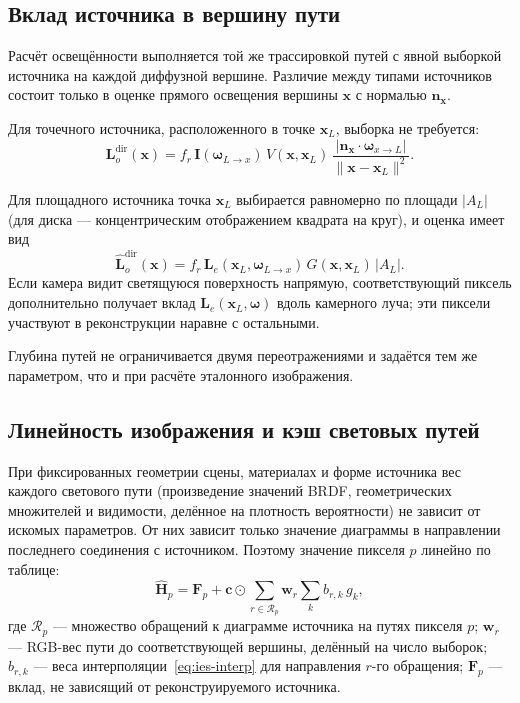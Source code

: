 \subsection{Вклад источника в вершину пути}

Расчёт освещённости выполняется той же трассировкой путей с явной выборкой источника на каждой диффузной вершине. Различие между типами источников состоит только в оценке прямого освещения вершины $\mathbf{x}$ с нормалью $\mathbf{n}_{\mathbf{x}}$.

Для точечного источника, расположенного в точке $\mathbf{x}_L$, выборка не требуется:
\begin{equation}
\mathbf{L}_o^{\text{dir}}(\mathbf{x})
=
f_r\,
\mathbf{I}(\boldsymbol{\omega}_{L\rightarrow x})\,
V(\mathbf{x},\mathbf{x}_L)\,
\frac{\left|\mathbf{n}_{\mathbf{x}}\cdot\boldsymbol{\omega}_{x\rightarrow L}\right|}
{\|\mathbf{x}-\mathbf{x}_L\|^2}.
\end{equation}

Для площадного источника точка $\mathbf{x}_L$ выбирается равномерно по площади $|A_L|$ (для диска --- концентрическим отображением квадрата на круг), и оценка имеет вид
\begin{equation}
\widehat{\mathbf{L}}_o^{\text{dir}}(\mathbf{x})
=
f_r\,
\mathbf{L}_e(\mathbf{x}_L,\boldsymbol{\omega}_{L\rightarrow x})\,
G(\mathbf{x},\mathbf{x}_L)\,
|A_L|.
\end{equation}
Если камера видит светящуюся поверхность напрямую, соответствующий пиксель дополнительно получает вклад $\mathbf{L}_e(\mathbf{x}_L,\boldsymbol{\omega})$ вдоль камерного луча; эти пиксели участвуют в реконструкции наравне с остальными.

Глубина путей не ограничивается двумя переотражениями и задаётся тем же параметром, что и при расчёте эталонного изображения.

\subsection{Линейность изображения и кэш световых путей}

При фиксированных геометрии сцены, материалах и форме источника вес каждого светового пути (произведение значений BRDF, геометрических множителей и видимости, делённое на плотность вероятности) не зависит от искомых параметров. От них зависит только значение диаграммы в направлении последнего соединения с источником. Поэтому значение пикселя $p$ линейно по таблице:
\begin{equation}
\widehat{\mathbf{H}}_p
=
\mathbf{F}_p
+
\mathbf{c}\odot
\sum_{r\in\mathcal{R}_p}
\mathbf{w}_r
\sum_k b_{r,k}\,g_k,
\label{eq:ies-linear}
\end{equation}
где $\mathcal{R}_p$ --- множество обращений к диаграмме источника на путях пикселя $p$; $\mathbf{w}_r$ --- RGB-вес пути до соответствующей вершины, делённый на число выборок; $b_{r,k}$ --- веса интерполяции~\eqref{eq:ies-interp} для направления $r$-го обращения; $\mathbf{F}_p$ --- вклад, не зависящий от реконструируемого источника.

